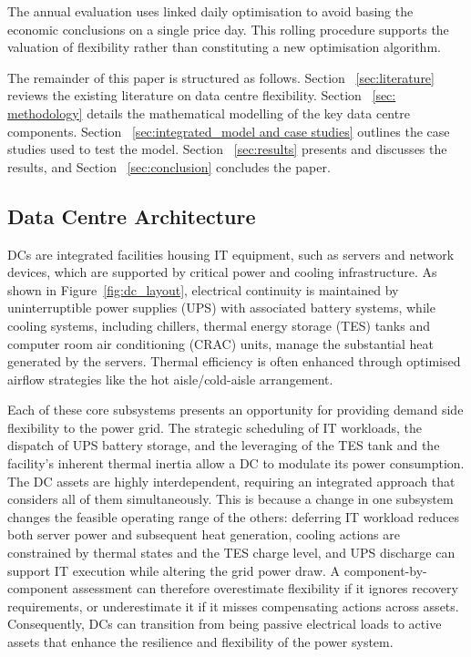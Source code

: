 \documentclass[lettersize,journal]{IEEEtran}
\providecommand{\DIFadd}[1]{{\color{blue}#1}}
\providecommand{\DIFaddbegin}{}
\providecommand{\DIFaddend}{}
\begin{document}
\DIFadd{The annual evaluation uses linked daily optimisation to avoid basing the economic conclusions on a single price day. This rolling procedure supports the valuation of flexibility rather than constituting a new optimisation algorithm.

}

\DIFadd{The }\DIFaddend remainder of this paper is structured as follows. Section \DIFaddbegin \DIFadd{~\ref{sec:literature} }\DIFaddend reviews the existing literature on data centre flexibility. Section \DIFaddbegin \DIFadd{~\ref{sec: methodology} }\DIFaddend details the mathematical modelling of the key data centre components. Section \DIFaddbegin \DIFadd{~\ref{sec:integrated_model and case studies} }\DIFaddend outlines the case studies used to test the model. Section \DIFaddbegin \DIFadd{~\ref{sec:results} }\DIFaddend presents and discusses the results, and Section \DIFaddbegin \DIFadd{~\ref{sec:conclusion} }\DIFaddend concludes the paper. 

\subsection{Data Centre Architecture}
DCs are integrated facilities housing IT equipment, such as servers and network devices, which are supported by critical power and cooling infrastructure. As shown in Figure~\ref{fig:dc_layout}, electrical continuity is maintained by uninterruptible power supplies (UPS) with associated battery systems, while cooling systems, including chillers,  \DIFaddbegin \DIFadd{thermal energy storage }\DIFaddend (TES) tanks and  \DIFaddbegin \DIFadd{computer room air conditioning }\DIFaddend (CRAC) units, manage the substantial heat generated by the servers. Thermal efficiency is often enhanced through optimised airflow strategies like the  \DIFaddbegin \DIFadd{hot aisle}\DIFaddend /cold-aisle arrangement.

Each of these core subsystems presents an opportunity for providing  \DIFaddbegin \DIFadd{demand side }\DIFaddend flexibility to the power grid. The strategic scheduling of IT workloads, the dispatch of UPS battery storage, and the leveraging of the TES tank and the facility's inherent thermal inertia allow a DC to modulate its power consumption. The DC assets are highly interdependent, requiring an integrated approach that considers all of them simultaneously. \DIFaddbegin \DIFadd{This is because a change in one subsystem changes the feasible operating range of the others: deferring IT workload reduces both server power and subsequent heat generation, cooling actions are constrained by thermal states and the TES charge level, and UPS discharge can support IT execution while altering the grid power draw. A component-by-component assessment can therefore overestimate flexibility if it ignores recovery requirements, or underestimate it if it misses compensating actions across assets. }\DIFaddend Consequently, DCs can transition from being passive electrical loads to active assets that enhance the resilience and flexibility of the power system.
\end{document}
